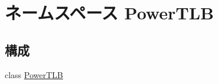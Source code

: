 \hypertarget{namespacePowerTLB}{
\section{ネームスペース PowerTLB}
\label{namespacePowerTLB}
}
\subsection*{構成}
\begin{DoxyCompactItemize}
\item 
class \hyperlink{classPowerTLB_1_1PowerTLB}{PowerTLB}
\end{DoxyCompactItemize}
